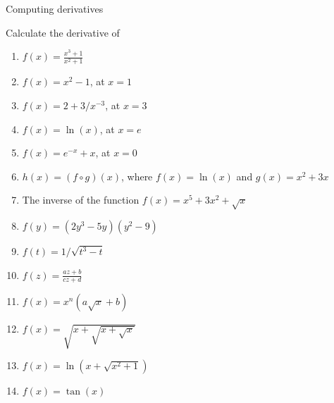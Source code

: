 \documentclass[9pt]{beamer}
\begin{document}
\begin{frame}{Computing derivatives}

    Calculate the derivative of 

    \begin{enumerate}[leftmargin = 0.5cm, label = (\alph*), rightmargin = 0.2cm]

        \item $f(x) = \frac{x^3 + 1}{x^2 + 1}$

        \item $f(x) = x^2 - 1$, at $x= 1$

        \item $f(x) = 2 + 3/x^{-3}$, at $x = 3$

        \item $f(x) = \ln(x)$, at $x = e$

        \item $f(x) = e^{-x} + x$, at $x = 0$

        \item $h(x) = (f\circ g)(x)$, where $f(x) = \ln(x)$ and $g(x) = x^2 + 3x$

        \item The inverse of the function $f(x) = x^5 + 3x^2 + \sqrt{x}$

        \item $f(y) = (2y^3 - 5y)(y^2 - 9)$

        \item $f(t) = 1/\sqrt{t^3 - t}$

        \item $f(z) = \frac{az + b}{cz + d}$

        \item $f(x) = x^n(a\sqrt{x} + b)$

        \item $f(x) = \sqrt{x + \sqrt{x + \sqrt{x}}}$

        \item $f(x) = \ln(x + \sqrt{x^2 + 1})$

        \item $f(x) = \tan(x)$
        
    \end{enumerate}
    
\end{frame}
\end{document}
